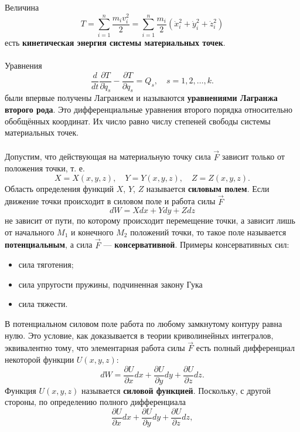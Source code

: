 \documentclass[a4paper, 12pt]{report}
\numberwithin{equation}{section}
\begin{document}
	\\\\
	Величина
	\begin{equation*}
		T = \sum_{i=1}^n \frac{m_i v_i^2}{2} = \sum_{i=1}^n \frac{m_i}{2} \left( \dot{x}_i^2 + \dot{y}_i^2 + \dot{z}_i^2 \right)
	\end{equation*}
	есть \textbf{кинетическая энергия системы материальных точек}.
	\\\\
	Уравнения 
	\begin{equation}
		\label{4.26}
		\frac{d}{dt} \frac{\partial T}{\partial \dot{q}_s} - \frac{\partial T}{\partial q_s} = Q_s, \quad s = 1, 2, \dots, k.
	\end{equation}
	были впервые получены Лагранжем и называются \textbf{уравнениями Лагранжа второго рода}. Это дифференциальные уравнения второго порядка относительно обобщённых координат. Их число равно числу степеней свободы системы материальных точек.
	\\\\
	Допустим, что действующая на материальную точку сила $\vec{F}$ зависит только от положения точки, т. е.
	\[
	X = X(x, y, z), \quad Y = Y(x, y, z), \quad Z = Z(x, y, z).
	\]
	Область определения функций $X$, $Y$, $Z$ называется \textbf{силовым полем}. Если движение точки происходит в силовом поле и работа силы $\vec{F}$
	\[
	dW = Xdx + Ydy + Zdz
	\]
	не зависит от пути, по которому происходит перемещение точки, а зависит лишь от начального $M_1$ и конечного $M_2$ положений точки, то такое поле называется \textbf{потенциальным}, а сила $\vec{F}$ --- \textbf{консервативной}. Примеры консервативных сил: \begin{itemize}
		\item сила тяготения;
		\item сила упругости пружины, подчиненная закону Гука
		\item сила тяжести.
	\end{itemize}
	В потенциальном силовом поле работа по любому замкнутому контуру равна нулю. Это условие, как доказывается в теории криволинейных интегралов, эквивалентно тому, что элементарная работа силы $\vec{F}$ есть полный дифференциал некоторой функции $U(x, y, z)$:
	\[
	dW = \frac{\partial U}{\partial x}dx + \frac{\partial U}{\partial y}dy + \frac{\partial U}{\partial z}dz.
	\]
	Функция $U(x, y, z)$ называется \textbf{силовой функцией}. Поскольку, с другой стороны, по определению полного дифференциала
	\[
	\frac{\partial U}{\partial x}dx + \frac{\partial U}{\partial y}dy + \frac{\partial U}{\partial z}dz,
	\]
\end{document}
